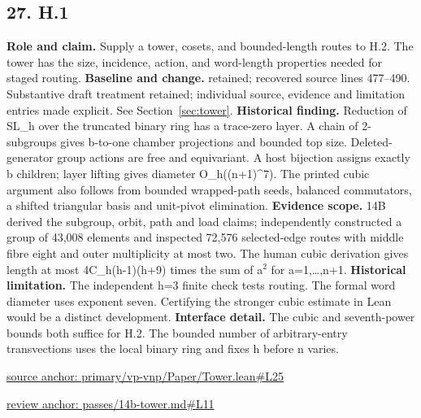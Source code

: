 \documentclass[11pt,letterpaper]{article}
\theoremstyle{definition}\newtheorem{definition}[theorem]{Definition}\newtheorem{example}[theorem]{Example}
\theoremstyle{remark}\newtheorem{remark}[theorem]{Remark}
\begin{document}
\subsection*{27. H.1}
\textbf{Role and claim.} Supply a tower, cosets, and bounded-length routes to H.2. The tower has the size, incidence, action, and word-length properties needed for staged routing.
\textbf{Baseline and change.} retained; recovered source lines 477--490. Substantive draft treatment retained; individual source, evidence and limitation entries made explicit. See Section~\ref{sec:tower}.
\textbf{Historical finding.} Reduction of SL\_h over the truncated binary ring has a trace-zero layer. A chain of 2-subgroups gives b-to-one chamber projections and bounded top size. Deleted-generator group actions are free and equivariant. A host bijection assigns exactly b children; layer lifting gives diameter O\_h((n+1)\textasciicircum{}7). The printed cubic argument also follows from bounded wrapped-path seeds, balanced commutators, a shifted triangular basis and unit-pivot elimination.
\textbf{Evidence scope.} 14B derived the subgroup, orbit, path and load claims; independently constructed a group of 43,008 elements and inspected 72,576 selected-edge routes with middle fibre eight and outer multiplicity at most two. The human cubic derivation gives length at most 4C\_h(h-1)(h+9) times the sum of a\ensuremath{{}^2} for a=1,…,n+1.
\textbf{Historical limitation.} The independent h=3 finite check tests routing. The formal word diameter uses exponent seven. Certifying the stronger cubic estimate in Lean would be a distinct development.
\textbf{Interface detail.} The cubic and seventh-power bounds both suffice for H.2. The bounded number of arbitrary-entry transvections uses the local binary ring and fixes h before n varies.
\par\href{https://github.com/nousentllc/VP-VNP-Review/blob/8a7976933b6b2b4ffda1ad3a0dfb5fc6b6f023e8/primary/vp-vnp/Paper/Tower.lean\#L25}{source anchor: primary/vp-vnp/Paper/Tower.lean\#L25}
\par\href{https://github.com/nousentllc/VP-VNP-Review/blob/8a7976933b6b2b4ffda1ad3a0dfb5fc6b6f023e8/passes/14b-tower.md\#L11}{review anchor: passes/14b-tower.md\#L11}
\goodbreak
\end{document}
